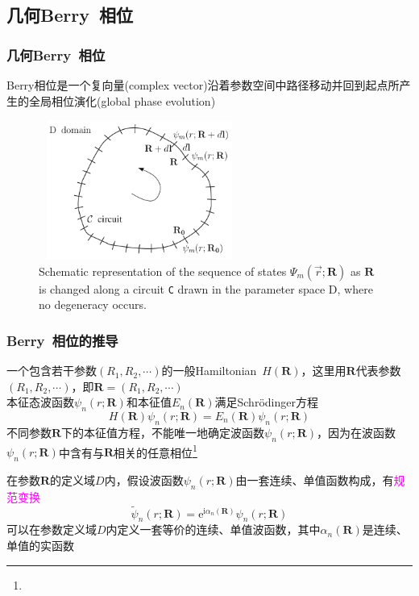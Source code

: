{\subsection{几何\rm{Berry~}相位}
\frame
{
	\frametitle{几何\textrm{Berry~}相位}
	\textrm{Berry}相位是一个复向量\textrm{(complex vector)}沿着参数空间中路径移动并回到起点所产生的全局相位演化\textrm{(global phase evolution)}
\begin{figure}[h!]
\centering
\vspace*{-0.12in}
\includegraphics[height=1.8in,width=2.6in,viewport=0 0 800 540,clip]{Figures/Berry_Phase.png}
\caption{\tiny \textrm{Schematic representation of the sequence of states $\Psi_m(\vec r;\mathbf{R})$ as $\mathbf{R}$ is changed along a circuit \texttt{C} drawn in the parameter space D, where no degeneracy occurs.}}%
\label{Berry_Phase}
\end{figure} 
}

\frame
{
	\frametitle{\textrm{Berry~}相位的推导}
	一个包含若干参数$(R_1,R_2,\cdots)$的一般\textrm{Hamiltonian}~$H(\mathbf{R})$，这里用$\mathbf{R}$代表参数$(R_1,R_2,\cdots)$，即$\mathbf{R}=(R_1,R_2,\cdots)$\\
	本征态波函数$\psi_n(r;\mathbf{R})$和本征值$E_n(\mathbf{R})$满足\textrm{Schr\"odinger}方程
	\begin{displaymath}
		H(\mathbf{R})\psi_n(r;\mathbf{R})=E_n(\mathbf{R})\psi_n(r;\mathbf{R})
	\end{displaymath}
	不同参数$\mathbf{R}$下的本征值方程，不能唯一地确定波函数$\psi_n(r;\mathbf{R})$，因为在波函数$\psi_n(r;\mathbf{R})$中含有与$\mathbf{R}$相关的任意相位\footnote{\fontsize{6.0pt}{3.2pt}}

	在参数$\mathbf{R}$的定义域$D$内，假设波函数$\psi_n(r;\mathbf{R})$由一套连续、单值函数构成，有\textcolor{magenta}{规范变换}
	\begin{displaymath}
		\tilde{\psi}_n(r;\mathbf{R})=\mathrm{e}^{\mathrm{i}\alpha_n(\mathbf{R})}\psi_n(r;\mathbf{R})
	\end{displaymath}
	可以在参数定义域$D$内定义一套等价的连续、单值波函数，其中$\alpha_n(\mathbf{R})$是连续、单值的实函数

}}
